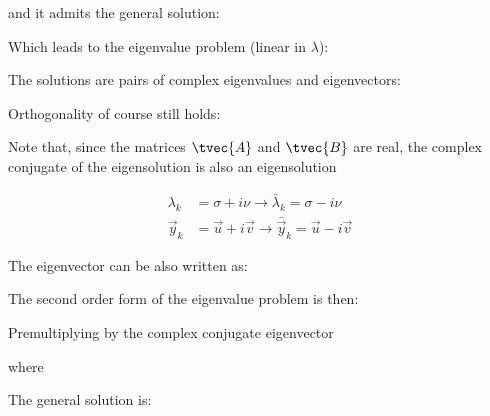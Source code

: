 \documentclass[10pt,a4paper]{scrartcl}
\begin{document}
\begin{multicols*}{2}

and it admits the general solution:


Which leads to the eigenvalue problem (linear in $\lambda$):


The solutions are pairs of complex eigenvalues and eigenvectors:


Orthogonality of course still holds:


Note that, since the matrices $\tvec{A}$ and $\tvec{B}$ are real, the complex conjugate of the eigensolution is also an eigensolution

\begin{align*}
\lambda_k&=\sigma+i\nu\rightarrow\bar{\lambda}_k=\sigma-i\nu\\
\vec{y}_k&=\vec{u}+i\vec{v}\rightarrow\bar{\vec{y}}_k=\vec{u}-i\vec{v}
\end{align*}

The eigenvector can be also written as:


The second order form of the eigenvalue problem is then:


Premultiplying by the complex conjugate eigenvector


where


The general solution is:



\end{multicols*}
\end{document}
